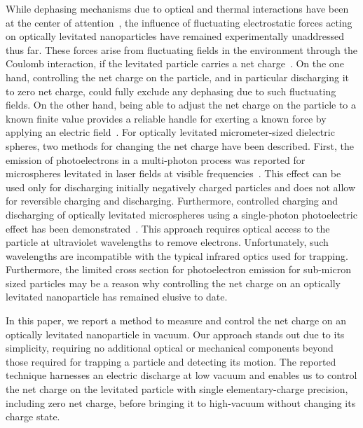 \documentclass[aps,amssymb,amsmath,pra,reprint,noshowpacs]{revtex4-1}
\begin{document}
While dephasing mechanisms due to optical and thermal interactions have been at the center of attention~\cite{Millen2014}, the influence of fluctuating electrostatic forces acting on optically levitated nanoparticles have remained {experimentally} unaddressed thus far. These forces arise from fluctuating fields in the environment through the Coulomb interaction, if the levitated particle carries a net charge~{\cite{Ugolini2008,Turchette2000}}. On the one hand, controlling the net charge on the particle, and in particular discharging it to zero net charge, could fully exclude any dephasing due to such fluctuating fields. On the other hand, being able to adjust the net charge on the particle to a known finite value provides a reliable handle for exerting a known force by applying an electric field~{\cite{Ashkin1980,Ranjit2015,Ranjit2016}}.
For optically levitated micrometer-sized dielectric spheres, two methods for changing the net charge have been described. First, the emission of photoelectrons in a multi-photon process was reported for microspheres levitated in laser fields at visible frequencies~\cite{Ashkin1976}. This effect can be used only for discharging initially negatively charged particles and does not allow for reversible charging and discharging. Furthermore, controlled charging and discharging of optically levitated microspheres using a single-photon photoelectric effect has been demonstrated~\cite{Ashkin1980,Moore2014,Rider2016}.
{This approach requires optical access to the particle at ultraviolet wavelengths to remove electrons. Unfortunately, such wavelengths are incompatible with the typical infrared optics used for trapping.}
Furthermore, the limited cross section for photoelectron emission for sub-micron sized particles may be a reason why controlling the net charge on an optically levitated nanoparticle has remained elusive to date.

In this paper, we report a method to measure and control the net charge on an optically levitated nanoparticle in vacuum. Our approach stands out due to its simplicity, requiring no additional optical or mechanical components beyond those required for trapping a particle and detecting its motion. The reported technique harnesses an electric discharge at low vacuum and enables us to control the net charge on the levitated particle with single elementary-charge precision, including zero net charge, before bringing it to high-vacuum without changing its charge state.
\end{document}
